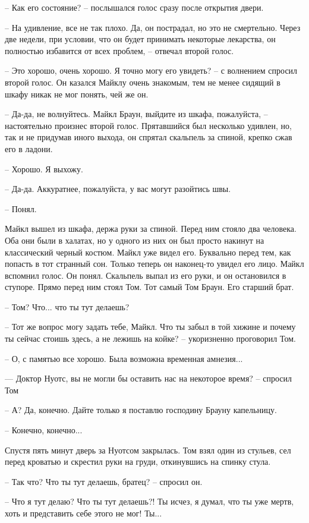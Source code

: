 – Как его состояние? – послышался голос сразу после открытия двери. 

– На удивление, все не так плохо. Да, он пострадал, но это не смертельно. Через две недели, при условии, что он будет принимать некоторые лекарства, он полностью избавится от всех проблем, – отвечал второй голос. 

– Это хорошо, очень хорошо. Я точно могу его увидеть? – с волнением спросил второй голос. Он казался Майклу очень знакомым, тем не менее сидящий в шкафу никак не мог понять, чей же он.

– Да-да, не волнуйтесь. Майкл Браун, выйдите из шкафа, пожалуйста, – настоятельно произнес второй голос. Прятавшийся был несколько удивлен, но, так и не придумав иного выхода, он спрятал скальпель за спиной, крепко сжав его в ладони.

– Хорошо. Я выхожу. 

– Да-да. Аккуратнее, пожалуйста, у вас могут разойтись швы. 

– Понял.

Майкл вышел из шкафа, держа руки за спиной. Перед ним стояло два человека. Оба они были в халатах, но у одного из них он был просто накинут на классический черный костюм. Майкл уже видел его. Буквально перед тем, как попасть в тот странный сон. Только теперь он наконец-то увидел его лицо. Майкл вспомнил голос. Он понял. Скальпель выпал из его руки, и он остановился в ступоре. Прямо перед ним стоял Том. Тот самый Том Браун. Его старший брат.

– Том? Что... что ты тут делаешь? 

– Тот же вопрос могу задать тебе, Майкл. Что ты забыл в той хижине и почему ты сейчас стоишь здесь, а не лежишь на койке? – укоризненно проговорил Том. 

– О, с памятью все хорошо. Была возможна временная амнезия... 

— Доктор Нуотс, вы не могли бы оставить нас на некоторое время? – спросил Том 

– А? Да, конечно. Дайте только я поставлю господину Брауну капельницу.

– Конечно, конечно...

Спустя пять минут дверь за Нуотсом закрылась. Том взял один из стульев, сел перед кроватью и скрестил руки на груди, откинувшись на спинку стула. 

– Так что? Что ты тут делаешь, братец? – спросил он. 

– Что я тут делаю? Что ты тут делаешь?! Ты исчез, я думал, что ты уже мертв, хоть и представить себе этого не мог! Ты...

